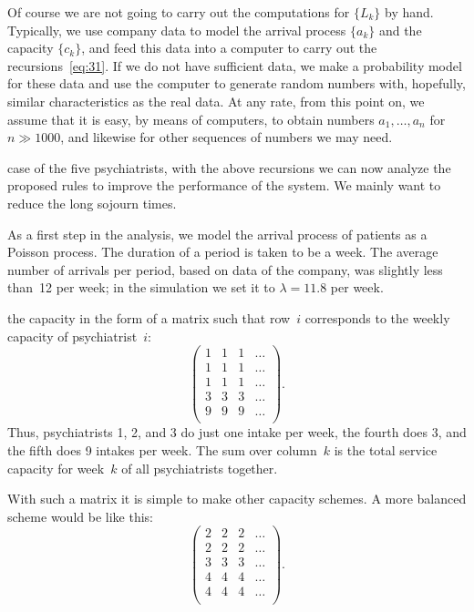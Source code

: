 \documentclass[queueing-book.tex]{subfiles}
\begin{document}
Of course we are not going to carry out the computations for $\{L_k\}$ by hand.
Typically, we use company data to model the arrival process $\{a_k\}$ and the capacity $\{c_k\}$, and feed this data into a computer to carry out the recursions~\cref{eq:31}.
If we do not have sufficient data, we make a probability model for these data and use the computer to generate random numbers with, hopefully, similar characteristics as the real data.
At any rate, from this point on, we assume that it is easy, by means of computers, to obtain numbers $a_1,\ldots, a_n$ for $n\gg 1000$, and likewise for other sequences of numbers we may need.


 case of the five psychiatrists, with the above recursions we can now analyze the proposed rules to improve the performance of the system.
We mainly want to reduce the long sojourn times.

As a first step in the analysis, we model the arrival process of patients as a Poisson process.
The duration of a period is taken to be a week.
The average number of arrivals per period, based on data of the company, was slightly less than~12 per week; in the simulation we set it to $\lambda= 11.8$ per week.

 the capacity in the form of a matrix such that row~$i$ corresponds to the weekly capacity of psychiatrist~$i$:
\begin{equation}\label{eq:6}
 \begin{pmatrix}
 1 & 1 & 1 & \ldots\\
 1 & 1 & 1 & \ldots\\
 1 & 1 & 1 & \ldots\\
 3 & 3 & 3 & \ldots\\
 9 & 9 & 9 & \ldots\\
 \end{pmatrix}.
\end{equation}
Thus, psychiatrists 1, 2, and 3 do just one intake per week, the
fourth does 3, and the fifth does 9 intakes per week. The sum over
column~$k$ is the total service capacity for week~$k$ of all
psychiatrists together.

With such a matrix it is simple to make other capacity schemes.
A more balanced scheme would be like this:
\begin{equation}\label{eq:9}
 \begin{pmatrix}
 2 & 2 & 2 & \ldots\\
 2 & 2 & 2 & \ldots\\
 3 & 3 & 3 & \ldots\\
 4 & 4 & 4 & \ldots\\
 4 & 4 & 4 & \ldots\\
 \end{pmatrix}.
\end{equation}
\end{document}
